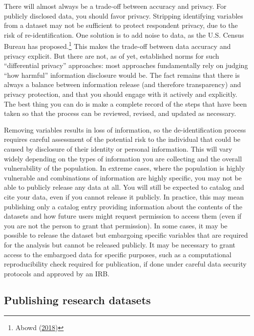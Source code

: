 \documentclass[
]{book}
\begin{document}
There will almost always be a trade-off between accuracy and privacy.
For publicly disclosed data, you should favor privacy.
Stripping identifying variables from a dataset may not be sufficient to protect respondent privacy,
due to the risk of re-identification.
One solution is to add noise to data, as the U.S. Census Bureau has proposed.\footnote{Abowd (\protect\hyperlink{ref-abowd2018us}{2018})}
This makes the trade-off between data accuracy and privacy explicit.
But there are not, as of yet, established norms for such ``differential privacy'' approaches:
most approaches fundamentally rely on judging ``how harmful'' information disclosure would be.
The fact remains that there is always a balance between information release (and therefore transparency)
and privacy protection, and that you should engage with it actively and explicitly.
The best thing you can do is make a complete record of the steps that have been taken
so that the process can be reviewed, revised, and updated as necessary.

Removing variables results in loss of information, so the de-identification process
requires careful assessment of the potential risk to the individual
that could be caused by disclosure of their identity or personal information.
This will vary widely depending on the types of information
you are collecting and the overall vulnerability of the population.
In extreme cases, where the population is highly vulnerable
and combinations of information are highly specific,
you may not be able to publicly release any data at all.
You will still be expected to catalog and cite your data,
even if you cannot release it publicly.
In practice, this may mean publishing only a catalog entry
providing information about the contents of the datasets
and how future users might request permission to access them
(even if you are not the person to grant that permission).
In some cases, it may be possible to release the dataset but
embargoing specific variables that are required for the analysis but cannot be released publicly.
It may be necessary to grant access to the embargoed data for specific purposes,
such as a computational reproducibility check required for publication,
if done under careful data security protocols and approved by an IRB.

\hypertarget{publishing-research-datasets}{%
\subsection*{Publishing research datasets}\label{publishing-research-datasets}}
\end{document}
